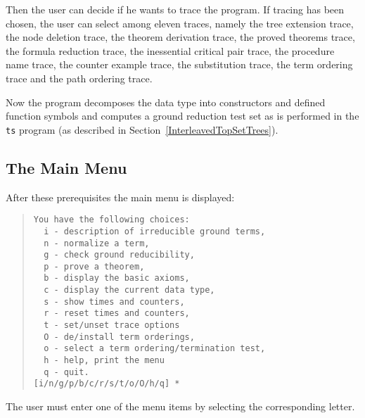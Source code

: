 Then the user can decide if he wants to trace the program. If tracing has been
chosen,
the user can select among eleven traces, namely the tree extension trace, the
node deletion trace, the
theorem derivation trace, the proved theorems trace, the formula reduction 
trace, the inessential critical pair trace, the procedure name trace, 
the counter example trace, the substitution trace, the term ordering
trace and the path ordering trace.

Now the program decomposes the data type into constructors 
and defined function symbols and computes a ground reduction test set 
as is performed in the {\tt ts} program
(as described in Section~\ref{InterleavedTopSetTrees}).

\subsection{The Main Menu}
After these prerequisites the main menu is displayed:
\begin{quote}
\begin{verbatim}
You have the following choices: 
  i - description of irreducible ground terms,
  n - normalize a term,
  g - check ground reducibility,
  p - prove a theorem,
  b - display the basic axioms,
  c - display the current data type,
  s - show times and counters,
  r - reset times and counters,
  t - set/unset trace options
  O - de/install term orderings,
  o - select a term ordering/termination test,
  h - help, print the menu
  q - quit.
[i/n/g/p/b/c/r/s/t/o/O/h/q] *
\end{verbatim}
\end{quote}
The user must enter one of the menu items by selecting the corresponding
letter.


